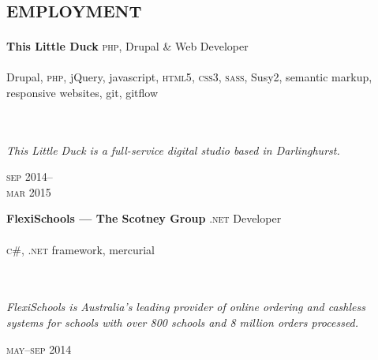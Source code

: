 
\vspace{-0.6cm}
\section*{\textsc{employment}}
\vspace{-0.2cm}

\begin{minipage}[t]{0.70\textwidth}
\textbf{This Little Duck}\phantom{..} \textsc{php}, Drupal \& Web Developer \\
\\
Drupal, \textsc{php}, jQuery, javascript, \textsc{html5}, 
\textsc{css3}, \textsc{sass}, Susy2, semantic markup, responsive websites,
git, gitflow
\\
\\
\\
{\small
\textit{This Little Duck is a full-service digital studio based in Darlinghurst.}
\par}
\end{minipage}
\begin{minipage}[t]{0.30\textwidth}
{
\hfill \textsc{sep} 2014--\\ 
\hspace*{0pt} \hfill \textsc{mar} 2015
\par
}
\end{minipage}

\vspace{0.2in}

\begin{minipage}[t]{0.7\textwidth}
\textbf{FlexiSchools --- The Scotney Group}\phantom{..} \textsc{.net} Developer \\
\\
\textsc{c\#}, \textsc{.net} framework, mercurial
\\
\\
\\
{\small
\textit{FlexiSchools is Australia’s leading provider of online ordering and cashless systems for schools with over 800 schools and 8 million orders processed. }
\par}
\end{minipage}
\begin{minipage}[t]{0.30\textwidth}
\hfill \textsc{may}--\textsc{sep} 2014\\
\end{minipage}

\vspace{0.2in}

